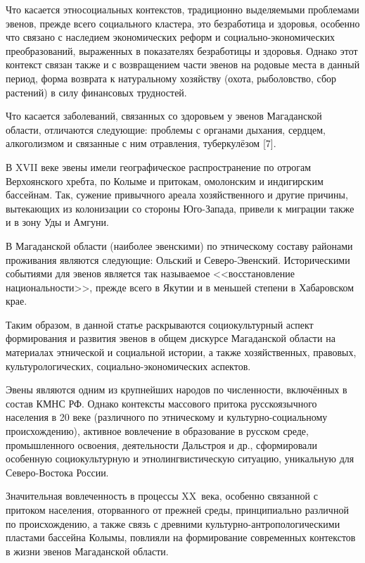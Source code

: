       Что касается этносоциальных контекстов, традиционно выделяемыми проблемами эвенов, прежде всего социального кластера, это безработица и здоровья, особенно что связано с наследием экономических реформ и социально-экономических преобразований, выраженных в показателях безработицы и здоровья. Однако этот контекст связан также и с возвращением части эвенов на родовые места в данный период, форма возврата к натуральному хозяйству (охота, рыболовство, сбор растений) в силу финансовых трудностей.

      Что касается заболеваний, связанных со здоровьем у эвенов Магаданской области, отличаются следующие: проблемы с органами дыхания, сердцем, алкоголизмом и связанные с ним отравления, туберкулёзом [7].

      В XVII веке эвены имели географическое распространение по отрогам Верхоянского хребта, по Колыме и притокам, омолонским и индигирским бассейнам. Так, сужение привычного ареала хозяйственного и другие причины, вытекающих из колонизации со стороны Юго-Запада, привели к миграции также и в зону Уды и Амгуни.

      В Магаданской области (наиболее эвенскими) по этническому составу районами проживания являются следующие: Ольский и Северо-Эвенский. Историческими событиями для эвенов является так называемое <<восстановление национальности>>, прежде всего в Якутии и в меньшей степени в Хабаровском крае.

      Таким образом, в данной статье раскрываются социокультурный аспект формирования и развития эвенов в общем дискурсе Магаданской области на материалах этнической и социальной истории, а также хозяйственных, правовых, культурологических, социально-экономических аспектов.

     Эвены являются одним из крупнейших народов по численности, включённых в состав КМНС РФ. Однако контексты массового притока русскоязычного населения в 20 веке (различного по этническому и культурно-социальному происхождению), активное вовлечение в образование в русском среде, промышленного освоения, деятельности Дальстроя и др., сформировали особенную социокультурную и этнолингвистическую ситуацию, уникальную для Северо-Востока России.

      Значительная вовлеченность в процессы XX~века, особенно связанной с притоком населения, оторванного от прежней среды, принципиально различной по происхождению, а также связь с древними культурно-антропологическими пластами бассейна Колымы, повлияли на формирование современных контекстов в жизни эвенов Магаданской области.


